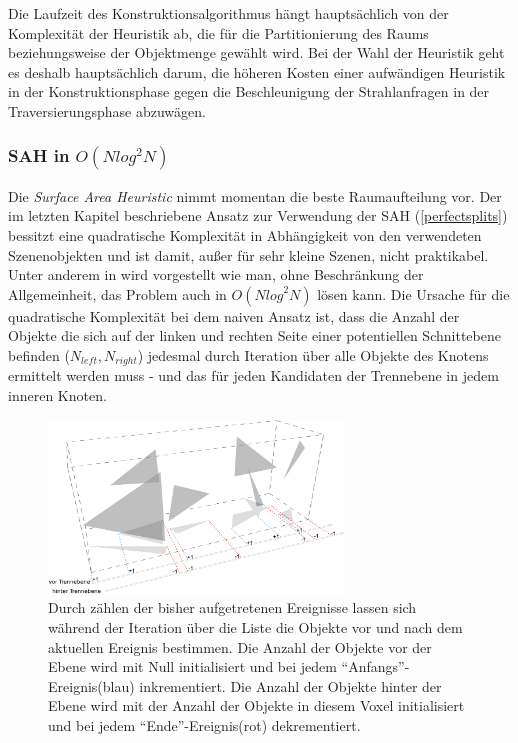 Die Laufzeit des Konstruktionsalgorithmus hängt hauptsächlich von der Komplexität der Heuristik ab, die für die Partitionierung des Raums beziehungsweise der Objektmenge gewählt wird. Bei der Wahl der Heuristik geht es deshalb hauptsächlich darum, die höheren Kosten einer aufwändigen Heuristik in der Konstruktionsphase gegen die Beschleunigung der Strahlanfragen in der Traversierungsphase abzuwägen.

\subsubsection{SAH in  $O(N {log}^2 N )$}
\label{sec:nlog2n}
Die \textit{Surface Area Heuristic} nimmt momentan die beste Raumaufteilung vor. Der im letzten Kapitel beschriebene Ansatz zur Verwendung der SAH (\ref{perfectsplits}) bessitzt eine quadratische Komplexität in Abhängigkeit von den verwendeten Szenenobjekten und ist damit, außer für sehr kleine Szenen, nicht praktikabel.
Unter anderem in \cite{PBRT} wird vorgestellt wie man, ohne Beschränkung der Allgemeinheit, das Problem auch in $O(N {log}^2 N )$ lösen kann. Die Ursache für die quadratische Komplexität bei dem naiven Ansatz ist, dass die Anzahl der Objekte die sich auf der linken und rechten Seite einer potentiellen Schnittebene befinden ($N_{left}, N_{right}$) jedesmal durch Iteration über alle Objekte des Knotens ermittelt werden muss - und das für jeden Kandidaten der Trennebene in jedem inneren Knoten.

\begin{figure}\centering
\includegraphics[width=0.7\textwidth]{images/splitevents.pdf} 
\caption[Inkrementelles Zählen der Objekte vor/hinter der Trennebene]{Durch zählen der bisher aufgetretenen Ereignisse lassen sich während der Iteration über die Liste die Objekte vor und nach dem aktuellen Ereignis bestimmen. Die Anzahl der Objekte vor der Ebene wird mit Null initialisiert und bei jedem ``Anfangs''-Ereignis(blau) inkrementiert. Die Anzahl der Objekte hinter der Ebene wird mit der Anzahl der Objekte in diesem Voxel initialisiert und bei jedem ``Ende''-Ereignis(rot) dekrementiert.}
\label{fig:splitevents}
\end{figure}

